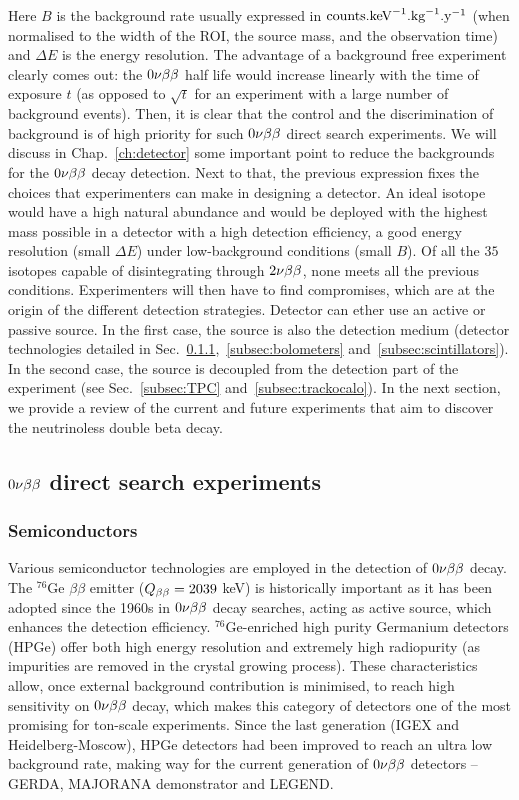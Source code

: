 Here $B$ is the background rate usually expressed in $\text{counts.keV}^{-1}\text{.kg}^{-1}\text{.y}^{-1}$ (when normalised to the width of the ROI, the source mass, and the observation time) and $\Delta E$ is the energy resolution.
The advantage of a background free experiment clearly comes out: the $0\nu\beta\beta$ half life would increase linearly with the time of exposure $t$ (as opposed to $\sqrt t$ for an experiment with a large number of background events).
Then, it is clear that the control and the discrimination of background is of high priority for such $0\nu\beta\beta$ direct search experiments.
We will discuss in Chap.~\ref{ch:detector} some important point to reduce the backgrounds for the $0\nu\beta\beta$ decay detection.
Next to that, the previous expression fixes the choices that experimenters can make in designing a detector.
An ideal isotope would have a high natural abundance and would be deployed with the highest mass possible in a detector with a high detection efficiency, a good energy resolution (small $\Delta E$) under low-background conditions (small $B$).
Of all the $35$ isotopes capable of disintegrating through $2\nu\beta\beta$, none meets all the previous conditions.
Experimenters will then have to find compromises, which are at the origin of the different detection strategies.
Detector can ether use an active or passive source.
In the first case, the source is also the detection medium (detector technologies detailed in Sec.~\ref{subsec:semiconductors},~\ref{subsec:bolometers} and~\ref{subsec:scintillators}).
In the second case, the source is decoupled from the detection part of the experiment (see Sec.~\ref{subsec:TPC} and~\ref{subsec:trackocalo}).
In the next section, we provide a review of the current and future experiments that aim to discover the neutrinoless double beta decay.


\subsection{$0\nu\beta\beta$ direct search experiments}
\label{sec:zeronuexp}
\subsubsection{Semiconductors}
\label{subsec:semiconductors}
Various semiconductor technologies are employed in the detection of $0\nu\beta\beta$ decay.
The $^{76}$Ge $\beta\beta$ emitter ($Q_{\beta\beta}=2039$ keV) is historically important as it has been adopted since the 1960s in $0\nu\beta\beta$ decay searches, acting as active source, which enhances the detection efficiency.
$^{76}$Ge-enriched high purity Germanium detectors (HPGe) offer both high energy resolution and extremely high radiopurity (as impurities are removed in the crystal growing process).
These characteristics allow, once external background contribution is minimised, to reach high sensitivity on $0\nu\beta\beta$ decay, which makes this category of detectors one of the most promising for ton-scale experiments.
Since the last generation (IGEX and Heidelberg-Moscow), HPGe detectors had been improved to reach an ultra low background rate, making way for the current generation of $0\nu\beta\beta$ detectors -- GERDA, MAJORANA demonstrator and LEGEND.

